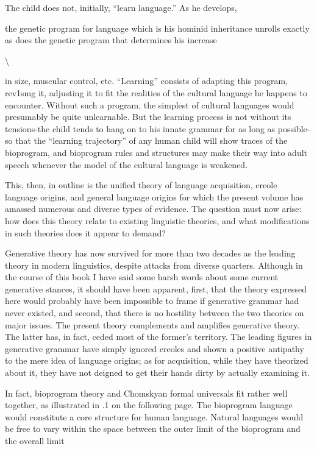 The child does not, initially, ``learn language.'' As he develops,

the genetic program for language which is his hominid inheritance unrolls exactly as does the genetic program that determines his increase

{\textbackslash}


in size, muscular control, etc. ``Learning'' consists of adapting this program, rev1smg it, adjusting it to fit the realities of the cultural language he happens to encounter. Without such a program, the sim\-plest of cultural languages would presumably be quite unlearnable. But the learning process is not without its tensions-the child tends to hang on to his innate grammar for as long as possible- so that the ``learning trajectory'' of any human child will show traces of the bioprogram, and bioprogram rules and structures may make their way into adult speech whenever the model of the cultural language is weakened.

This, then, in outline is the unified theory of language acquisi\-tion, creole language origins, and general language origins for which the present volume has amassed numerous and diverse types of evi\-dence. The question must now arise: how does this theory relate to existing linguistic theories, and what modifications in such theories does it appear to demand?

Generative theory has now survived for more than two decades as the leading theory in modern linguistics, despite attacks from diverse quarters. Although in the course of this book I have said some harsh words about some current generative stances, it should have been apparent, first, that the theory expressed here would probably have been impossible to frame if generative grammar had never existed, and second, that there is no hostility between the two theories on major issues. The present theory complements and amplifies generative theory. The latter has, in fact, ceded most of the former's territory. The leading figures in generative grammar have simply ignored creoles and shown a positive antipathy to the mere idea of language origins; as for acquisition, while they have theorized about it, they have not deigned to get their hands dirty by actually examining it.

In fact, bioprogram theory and Chomskyan formal universals fit rather well together, as illustrated in .1 on the following page. The bioprogram language would constitute a core structure for human language. Natural languages would be free to vary within the space between the outer limit of the bioprogram and the overall limit

